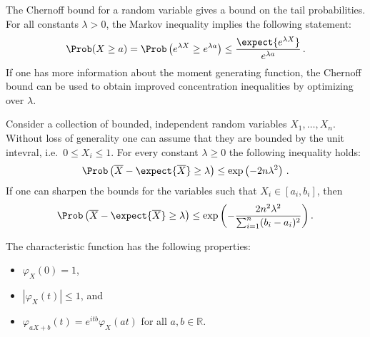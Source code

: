     \begin{method}
        The Chernoff bound for a random variable gives a bound on the tail probabilities. For all constants $\lambda>0$, the Markov inequality implies the following statement:
        \begin{gather}
            \Prob(X\geq a)=\Prob\left(e^{\lambda X}\geq e^{\lambda a}\right)\leq\frac{\expect{e^{\lambda X}}}{e^{\lambda a}}\,.
        \end{gather}
        If one has more information about the moment generating function, the Chernoff bound can be used to obtain improved concentration inequalities by optimizing over $\lambda$.
    \end{method}
    \begin{property}\label{prob:hoeffding_inequality}
        Consider a collection of bounded, independent random variables $X_1,\ldots,X_n$. Without loss of generality one can assume that they are bounded by the unit intevral, i.e.~$0\leq X_i\leq 1$. For every constant $\lambda\geq0$ the following inequality holds:
        \begin{gather}
            \Prob\left(\overline{X}-\expect{\overline{X}}\geq\lambda\right)\leq\exp\left(-2n\lambda^2\right)\,.
        \end{gather}
        If one can sharpen the bounds for the variables such that $X_i\in[a_i,b_i]$, then
        \begin{gather}
            \Prob\left(\overline{X}-\expect{\overline{X}}\geq\lambda\right)\leq\exp\left(-\frac{2n^2\lambda^2}{\sum_{i=1}^n(b_i-a_i)^2}\right).
        \end{gather}
    \end{property}

    \begin{property}\label{prob:characteristic_function_properties}
        The characteristic function has the following properties:
        \begin{itemize}
            \item $\varphi_X(0) = 1$,
            \item $|\varphi_X(t)| \leq 1$, and
            \item $\varphi_{aX+b}(t) = e^{itb}\varphi_X(at)$ for all $a,b\in\mathbb{R}$.
        \end{itemize}
    \end{property}

